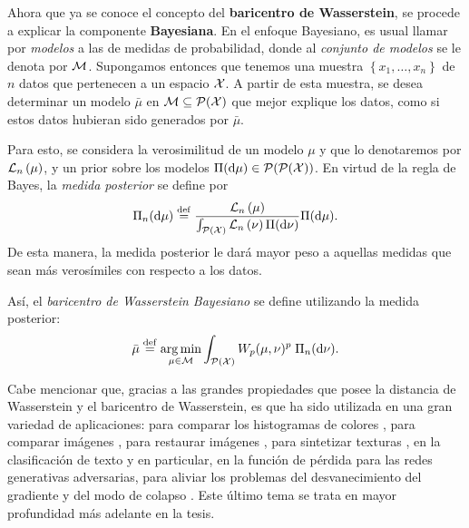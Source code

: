 Ahora que ya se conoce el concepto del \textbf{baricentro de Wasserstein}, se procede a explicar la componente \textbf{Bayesiana}. En el enfoque Bayesiano, es usual llamar por \emph{modelos} a las de medidas de probabilidad, donde al \emph{conjunto de modelos} se le denota por $\Models$.  Supongamos entonces que tenemos una muestra $\left\{ x_1, \ldots, x_n \right\}$ de $n$ datos que pertenecen a un espacio $\cX$.
A partir de esta muestra, se desea determinar un modelo $\bar{\mu}$ en $\Models\subseteq \ProbSpace[\cX]$ que mejor explique los datos, como si estos datos hubieran sido generados por $\bar{\mu}$.

Para esto, se considera la verosimilitud de un modelo $\mu$ y que lo denotaremos por $\LikelihoodN[\mu]$, y un prior sobre los modelos $\Pi(\dd \mu) \in \ProbSpace[\ProbSpace[\cX]]$. En virtud de la regla de Bayes, la \emph{medida posterior} se define por
\begin{equation}
    \Pi_n(\dd \mu) \eqdef \frac{\LikelihoodN[\mu]}{\int_{\ProbSpace[\cX]} \LikelihoodN[\nu] \Pi(\dd \nu)} \Pi(\dd \mu).
\end{equation}
De esta manera, la medida posterior le dará mayor peso a aquellas medidas que sean más verosímiles con respecto a los datos.

Así, el \emph{baricentro de Wasserstein Bayesiano} se define utilizando la medida posterior:
\begin{equation}
    \bar\mu \eqdef \argmin_{\mu \in \Models} \int_{\ProbSpace[\cX]} \Wasserstein[p]{\mu}{\nu}^p \; {\Pi_n(\dd \nu)}.
\end{equation}


Cabe mencionar que, gracias a las grandes propiedades que posee la distancia de Wasserstein y el baricentro de Wasserstein, es que ha sido utilizada en una gran variedad de aplicaciones:
para comparar los histogramas de colores \cite{rubner1998metric}, para comparar imágenes \cite{peleg1989unified}, para restaurar imágenes \cite{lellmann2014imaging}, para sintetizar texturas \cite{tartavel2016wasserstein}, en la clasificación de texto \cite{kusner2015word} y en particular,
en la función de pérdida para las redes generativas adversarias, para aliviar los problemas del desvanecimiento del gradiente y del modo de colapso \cite{arjovsky2017wasserstein}. Este último tema se trata en mayor profundidad más adelante en la tesis.

